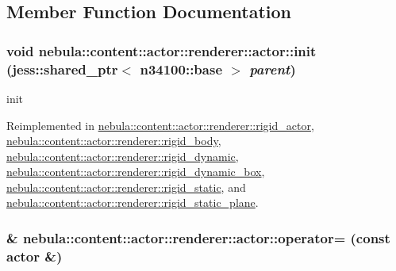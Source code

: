 \subsection{Member Function Documentation}
\hypertarget{classnebula_1_1content_1_1actor_1_1renderer_1_1actor_a67bf8a3f3b53c523edced67701af7bf0}{
\subsubsection[{init}]{\setlength{\rightskip}{0pt plus 5cm}void nebula::content::actor::renderer::actor::init (jess::shared\_\-ptr$<$ {\bf n34100::base} $>$ {\em parent})}}
\label{classnebula_1_1content_1_1actor_1_1renderer_1_1actor_a67bf8a3f3b53c523edced67701af7bf0}


init 

Reimplemented in \hyperlink{classnebula_1_1content_1_1actor_1_1renderer_1_1rigid__actor_aefd8a0b2b060c60669607f3cc060b607}{nebula::content::actor::renderer::rigid\_\-actor}, \hyperlink{classnebula_1_1content_1_1actor_1_1renderer_1_1rigid__body_afd1175cdc7b35a918db4bd89c59463f0}{nebula::content::actor::renderer::rigid\_\-body}, \hyperlink{classnebula_1_1content_1_1actor_1_1renderer_1_1rigid__dynamic_ab957f8a465493d2a9d7a2f0015d4a5ea}{nebula::content::actor::renderer::rigid\_\-dynamic}, \hyperlink{classnebula_1_1content_1_1actor_1_1renderer_1_1rigid__dynamic__box_a73d0f162b01df6a9f025d51477d37789}{nebula::content::actor::renderer::rigid\_\-dynamic\_\-box}, \hyperlink{classnebula_1_1content_1_1actor_1_1renderer_1_1rigid__static_a44a1c6a982296b5f1d4c0919c2c4ecf1}{nebula::content::actor::renderer::rigid\_\-static}, and \hyperlink{classnebula_1_1content_1_1actor_1_1renderer_1_1rigid__static__plane_aae78beb9e7389ea77d6a8103ec388972}{nebula::content::actor::renderer::rigid\_\-static\_\-plane}.\hypertarget{classnebula_1_1content_1_1actor_1_1renderer_1_1actor_ac6d5635a4fcdbf531ff46b4c9f9623c7}{
\subsubsection[{operator=}]{\& nebula::content::actor::renderer::actor::operator= (const {\bf actor} \&)}}
\label{classnebula_1_1content_1_1actor_1_1renderer_1_1actor_ac6d5635a4fcdbf531ff46b4c9f9623c7}


